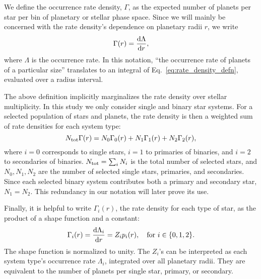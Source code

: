 We define the occurrence rate density, $\Gamma$, as the expected number of 
planets per star per bin of planetary or stellar phase space.
Since we will mainly be concerned with the rate density's dependence on 
planetary radii $r$, we write
\begin{equation}
\Gamma(r) = \frac{{\rm d}\Lambda}{{\rm d}r},
\label{eq:rate_density_defn}
\end{equation}
where $\Lambda$ is the occurrence rate.
In this notation, ``the occurrence rate of planets of a particular size'' 
translates to an integral of Eq.~\ref{eq:rate_density_defn}, evaluated over a 
radius interval.

The above definition implicitly marginalizes the rate density over stellar 
multiplicity.
In this study we only consider single and binary star systems.
For a selected population of stars and planets, the rate density is then 
a weighted sum of rate densities for each system type:
\begin{equation}
N_{\rm tot} \Gamma(r) =
N_0 \Gamma_0(r) +
N_1 \Gamma_1(r) +
N_2 \Gamma_2(r),
\label{eq:rate_density_marginalized}
\end{equation}
where $i=0$ corresponds to single stars, $i=1$ to primaries of 
binaries, and $i=2$ to secondaries of binaries.
$N_{\rm tot} = \sum_i N_i$ is the total number of selected stars, and 
$N_0,N_1,N_2$ are the number of selected single stars, primaries, and 
secondaries.
Since each selected binary system contributes both a 
primary and secondary star, $N_1=N_2$.
This redundancy in our notation will later prove its use.

Finally, it is helpful to write 
$\Gamma_i(r)$, the rate density for each type of star, as the product of a 
shape function and a constant:
\begin{equation}
\Gamma_i(r) = \frac{{\rm d}\Lambda_i}{{\rm d}r} = Z_i p_i(r),
\quad {\rm for}\ i\in\{0,1,2\}.
\label{eq:rate_density_shape}
\end{equation}
The shape function is normalized to unity.
The $Z_i$'s can be interpreted as each system type's occurrence rate 
$\Lambda_i$, integrated over all planetary radii.
They are equivalent to the number of planets per single star, primary, or 
secondary.


